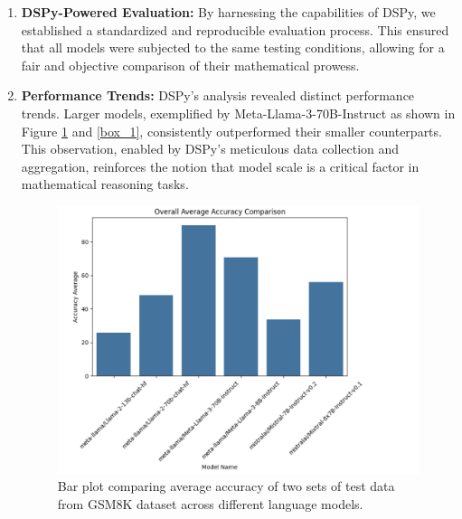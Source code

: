 


\begin{enumerate}
    \item \textbf{DSPy-Powered Evaluation:} By harnessing the capabilities of DSPy, we established a standardized and reproducible evaluation process. This ensured that all models were subjected to the same testing conditions, allowing for a fair and objective comparison of their mathematical prowess.

    \item \textbf{Performance Trends:} DSPy's analysis revealed distinct performance trends. Larger models, exemplified by Meta-Llama-3-70B-Instruct as shown in Figure \ref{bar_1} and \ref{box_1}, consistently outperformed their smaller counterparts. This observation, enabled by DSPy's meticulous data collection and aggregation, reinforces the notion that model scale is a critical factor in mathematical reasoning tasks.

    \begin{figure}
    \centering
    \includegraphics[width=\textwidth,]{report_template/images/bar_1.png}
    \caption{Bar plot comparing average accuracy of two sets of test data from GSM8K dataset across different language models.}
    \label{bar_1}
    \end{figure}


\end{enumerate}
